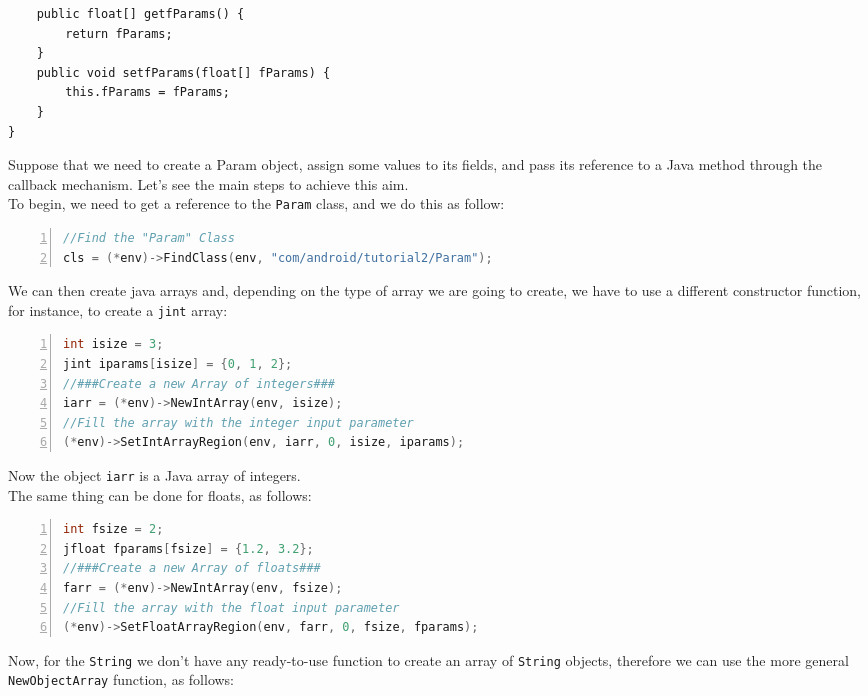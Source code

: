 \documentclass[a4paper,10pt]{article}
\newcommand{\keyword}[1]{\texttt{#1}}
\begin{document}
\begin{multicols}{2}
\begin{lstlisting}
	public float[] getfParams() {
		return fParams;
	}
	public void setfParams(float[] fParams) {
		this.fParams = fParams;
	}
}
\end{lstlisting}
Suppose that we need to create a Param object, assign some values to its fields, and pass its reference to a Java method through the callback mechanism. Let's see the main steps to achieve this aim.\\
To begin, we need to get a reference to the \keyword{Param} class, and we do this as follow:
\begin{lstlisting}[language=C,
				   columns=fullflexible,
				   showstringspaces=false,
				   xleftmargin=15pt,
				   frame = l,
				   numbers=left,
				   commentstyle=\color{gray}\upshape]
//Find the "Param" Class
cls = (*env)->FindClass(env, "com/android/tutorial2/Param");
\end{lstlisting}
We can then create java arrays and, depending on the type of array we are going to create, we have to use a different constructor function, for instance, to create a \keyword{jint} array:
\begin{lstlisting}[language=C,
				   columns=fullflexible,
				   showstringspaces=false,
				   xleftmargin=15pt,
				   frame = l,
				   numbers=left,
				   commentstyle=\color{gray}\upshape]
int isize = 3;
jint iparams[isize] = {0, 1, 2};
//###Create a new Array of integers###
iarr = (*env)->NewIntArray(env, isize);
//Fill the array with the integer input parameter
(*env)->SetIntArrayRegion(env, iarr, 0, isize, iparams);
\end{lstlisting}
Now the object \keyword{iarr} is a Java array of integers.\\
The same thing can be done for floats, as follows:
\begin{lstlisting}[language=C,
				   columns=fullflexible,
				   showstringspaces=false,
				   xleftmargin=15pt,
				   frame = l,
				   numbers=left,
				   commentstyle=\color{gray}\upshape]
int fsize = 2;
jfloat fparams[fsize] = {1.2, 3.2};
//###Create a new Array of floats###
farr = (*env)->NewIntArray(env, fsize);
//Fill the array with the float input parameter
(*env)->SetFloatArrayRegion(env, farr, 0, fsize, fparams);
\end{lstlisting}
Now, for the \keyword{String} we don't have any ready-to-use function to create an array of \keyword{String} objects, therefore we can use the more general \keyword{NewObjectArray} function, as follows:
\begin{lstlisting}[language=C,
				   columns=fullflexible,
				   showstringspaces=false,
				   xleftmargin=15pt,
				   frame = l,
				   numbers=left,
				   commentstyle=\color{gray}\upshape]

\end{lstlisting}
\end{multicols}
\end{document}
